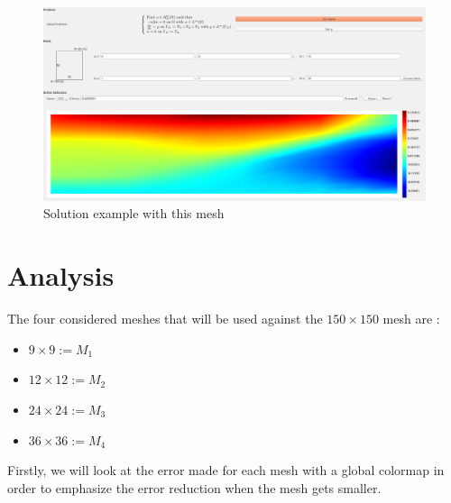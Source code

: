 \documentclass[a4paper]{report}
\begin{document}
\begin{figure}[H]
\begin{center}
\includegraphics[scale=0.20]{reference_sol.png}\caption{Solution example with this mesh}
\end{center}
\end{figure}


\section{Analysis}
The four considered meshes that will be used against the $150\times 150$ mesh are : 
\begin{itemize}
\item $ 9\times 9:=M_1$
\item $12 \times 12:=M_2$
\item $24\times  24:=M_3$
\item $36 \times 36:=M_4$
\end{itemize}
Firstly, we will look at the error made for each mesh with a global colormap in order to emphasize the error reduction when the mesh gets smaller.\\
\end{document}
